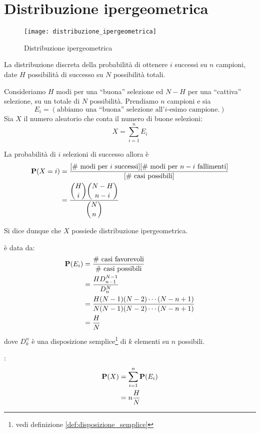 \section{Distribuzione ipergeometrica} %
\begin{figure*}
  \texttt{[image: distribuzione\_ipergeometrica]}
  \caption{Distribuzione ipergeometrica}
\end{figure*}

\begin{definition}
  \label{def:distribuzione_ipergeometrica}
  La distribuzione discreta della probabilità di ottenere \( i \) successi su \( n \) campioni, date \( H \) possibilità di successo su \( N \) possibilità totali.
\end{definition}
Consideriamo \( H \) modi per una ``buona'' selezione ed \( N - H \) per una ``cattiva'' selezione, su un totale di \( N \) possibilità.
Prendiamo \( n \) campioni e sia
\[ E_i = (\text{abbiamo una ``buona'' selezione all'}i\text{-esimo campione.}) \]
Sia \( X \) il numero aleatorio che conta il numero di buone selezioni:
\[ X = \sum_{i = 1}^n E_i \]

La probabilità di \( i \) selezioni di successo allora è
\begin{align*}
  \mathbf{P}(X = i) &= \frac{[\text{\# modi per }i\text{ successi}][\text{\# modi per }n - i\text{ fallimenti}]}{[\text{\# casi possibili}]} \\
  &= \frac{\displaystyle \binom{H}{i} \binom{N-H}{n-i}}{\displaystyle \binom{N}{n}}
\end{align*}

Si dice dunque che \( X \) possiede distribuzione ipergeometrica.

 è data da:
\begin{align*}
  \pr(E_i) &= \frac{\text{\# casi favorevoli}}{\text{\# casi possibili}} \\
  &= \frac{H D_{n-1}^{N-1}}{D_n^N} \\
  &= \frac{H (N-1)(N-2) \cdots (N-n+1)}{N(N-1)(N-2) \cdots (N-n+1)} \\ %
  &= \frac{H}{N}
\end{align*}
dove \( D_k^n \) è una disposizione semplice\footnote{vedi definizione \ref{def:disposizione_semplice}} di \( k \) elementi su \( n \) possibili.

:
\begin{align*}
  \mathbf{P}(X) &= \sum_{i=1}^n \mathbf{P}(E_i) \\
  &= n \frac{H}{N}
\end{align*}

